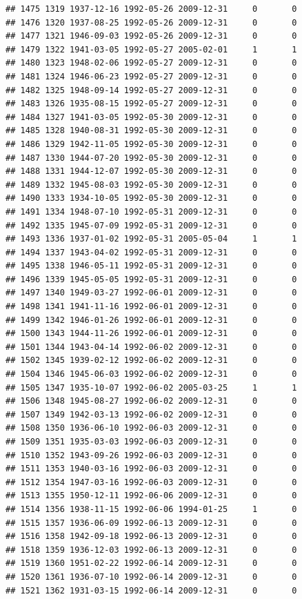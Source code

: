 \documentclass[
]{book}
\begin{document}
\begin{verbatim}
## 1475 1319 1937-12-16 1992-05-26 2009-12-31     0       0
## 1476 1320 1937-08-25 1992-05-26 2009-12-31     0       0
## 1477 1321 1946-09-03 1992-05-26 2009-12-31     0       0
## 1479 1322 1941-03-05 1992-05-27 2005-02-01     1       1
## 1480 1323 1948-02-06 1992-05-27 2009-12-31     0       0
## 1481 1324 1946-06-23 1992-05-27 2009-12-31     0       0
## 1482 1325 1948-09-14 1992-05-27 2009-12-31     0       0
## 1483 1326 1935-08-15 1992-05-27 2009-12-31     0       0
## 1484 1327 1941-03-05 1992-05-30 2009-12-31     0       0
## 1485 1328 1940-08-31 1992-05-30 2009-12-31     0       0
## 1486 1329 1942-11-05 1992-05-30 2009-12-31     0       0
## 1487 1330 1944-07-20 1992-05-30 2009-12-31     0       0
## 1488 1331 1944-12-07 1992-05-30 2009-12-31     0       0
## 1489 1332 1945-08-03 1992-05-30 2009-12-31     0       0
## 1490 1333 1934-10-05 1992-05-30 2009-12-31     0       0
## 1491 1334 1948-07-10 1992-05-31 2009-12-31     0       0
## 1492 1335 1945-07-09 1992-05-31 2009-12-31     0       0
## 1493 1336 1937-01-02 1992-05-31 2005-05-04     1       1
## 1494 1337 1943-04-02 1992-05-31 2009-12-31     0       0
## 1495 1338 1946-05-11 1992-05-31 2009-12-31     0       0
## 1496 1339 1945-05-05 1992-05-31 2009-12-31     0       0
## 1497 1340 1949-03-27 1992-06-01 2009-12-31     0       0
## 1498 1341 1941-11-16 1992-06-01 2009-12-31     0       0
## 1499 1342 1946-01-26 1992-06-01 2009-12-31     0       0
## 1500 1343 1944-11-26 1992-06-01 2009-12-31     0       0
## 1501 1344 1943-04-14 1992-06-02 2009-12-31     0       0
## 1502 1345 1939-02-12 1992-06-02 2009-12-31     0       0
## 1504 1346 1945-06-03 1992-06-02 2009-12-31     0       0
## 1505 1347 1935-10-07 1992-06-02 2005-03-25     1       1
## 1506 1348 1945-08-27 1992-06-02 2009-12-31     0       0
## 1507 1349 1942-03-13 1992-06-02 2009-12-31     0       0
## 1508 1350 1936-06-10 1992-06-03 2009-12-31     0       0
## 1509 1351 1935-03-03 1992-06-03 2009-12-31     0       0
## 1510 1352 1943-09-26 1992-06-03 2009-12-31     0       0
## 1511 1353 1940-03-16 1992-06-03 2009-12-31     0       0
## 1512 1354 1947-03-16 1992-06-03 2009-12-31     0       0
## 1513 1355 1950-12-11 1992-06-06 2009-12-31     0       0
## 1514 1356 1938-11-15 1992-06-06 1994-01-25     1       0
## 1515 1357 1936-06-09 1992-06-13 2009-12-31     0       0
## 1516 1358 1942-09-18 1992-06-13 2009-12-31     0       0
## 1518 1359 1936-12-03 1992-06-13 2009-12-31     0       0
## 1519 1360 1951-02-22 1992-06-14 2009-12-31     0       0
## 1520 1361 1936-07-10 1992-06-14 2009-12-31     0       0
## 1521 1362 1931-03-15 1992-06-14 2009-12-31     0       0

\end{verbatim}
\end{document}
